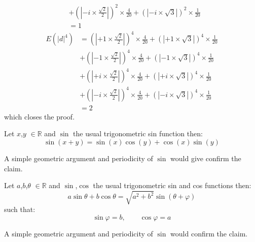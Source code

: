 \begin{Proof}
\begin{equation*}
\begin{split}
							&+\left(\left|-i \times \frac{\sqrt{2}}{2}\right|\right)^2\times \frac{4}{20}+\left(\left|-i \times \sqrt{3}\right|\right)^2\times \frac{1}{20}\\ 
			 &= 1
		\end{split}
	  \end{equation*}
	  \begin{equation*}
		\begin{split}
		E(\left|d\right|^4) &= \left(\left|+1 \times \frac{\sqrt{2}}{2}\right|\right)^4 \times \frac{4}{20} + \left(\left|+1 \times \sqrt{3}\right|\right)^4 \times \frac{1}{20}\\
		                    &+\left(\left|-1 \times \frac{\sqrt{2}}{2}\right|\right)^4 \times \frac{4}{20}+\left(\left|-1 \times \sqrt{3}\right|\right)^4 \times \frac{1}{20}\\
		                    &+ \left(\left|+i \times \frac{\sqrt{2}}{2}\right|\right)^4 \times \frac{4}{20} + \left(\left|+i \times \sqrt{3}\right|\right)^4 \times \frac{1}{20}\\
							&+\left(\left|-i \times \frac{\sqrt{2}}{2}\right|\right)^4 \times \frac{4}{20}+\left(\left|-i \times \sqrt{3}\right|\right)^4 \times \frac{1}{20}\\ 
			 &= 2
		\end{split}
	 \end{equation*}
	 which closes the proof.
\end{Proof}




\begin{Prop}
Let $x$,$y$ $\in \mathbb{R}$ and $\sin$ the usual trigonometric sin function then:
\begin{equation*}
	\sin(x+y) = \sin(x)\cos(y)+\cos(x)\sin(y)
\end{equation*}
\end{Prop}
\begin{Proof}
	A simple geometric argument and periodicity of $\sin$ would give confirm the claim.
\end{Proof}


\begin{Prop}
	Let $a$,$b$,$\theta$ $\in \mathbb{R}$ and $\sin$,$\cos$ the usual trigonometric sin and cos functions then:
	\begin{equation*}
		a\sin \theta+b\cos \theta  = \sqrt{a^2+b^2}\sin(\theta + \varphi)
	\end{equation*}
	such that:
	\begin{equation*}
		\sin\varphi=b, \qquad \cos\varphi = a
	\end{equation*}
	\end{Prop}
	\begin{Proof}
		A simple geometric argument and periodicity of $\sin$ would confirm the claim.
	\end{Proof}

